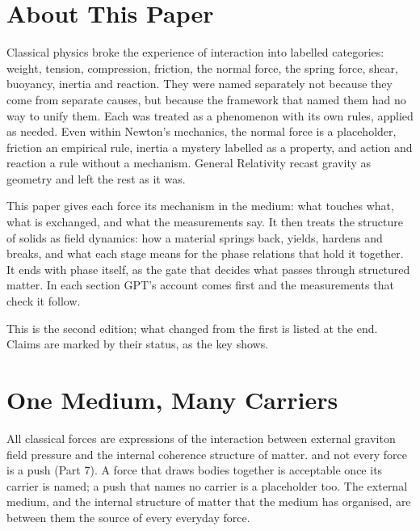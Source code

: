 \newcommand{\gptpart}{27}
\newcommand{\gpttitle}{Natural Force}
\newcommand{\gptsubtitle}{Every Force and Its Carrier}
\newcommand{\gptdate}{November 2026}

\graphicspath{{figs/}}

\gptitle

\section*{About This Paper}

Classical physics broke the experience of interaction into labelled categories: weight, tension, compression, friction, the normal force, the spring force, shear, buoyancy, inertia and reaction. They were named separately not because they come from separate causes, but because the framework that named them had no way to unify them. Each was treated as a phenomenon with its own rules, applied as needed. Even within Newton's mechanics, the normal force is a placeholder, friction an empirical rule, inertia a mystery labelled as a property, and action and reaction a rule without a mechanism. General Relativity recast gravity as geometry and left the rest as it was.

This paper gives each force its mechanism in the medium: what touches what, what is exchanged, and what the measurements say. It then treats the structure of solids as field dynamics: how a material springs back, yields, hardens and breaks, and what each stage means for the phase relations that hold it together. It ends with phase itself, as the gate that decides what passes through structured matter. In each section GPT's account comes first and the measurements that check it follow.

This is the second edition; what changed from the first is listed at the end. Claims are marked by their status, as the key shows.

\statuskey

\section{One Medium, Many Carriers}

All classical forces are expressions of the interaction between external graviton field pressure and the internal coherence structure of matter.  and not every force is a push (Part 7). A force that draws bodies together is acceptable once its carrier is named; a push that names no carrier is a placeholder too. The external medium, and the internal structure of matter that the medium has organised, are between them the source of every everyday force.

